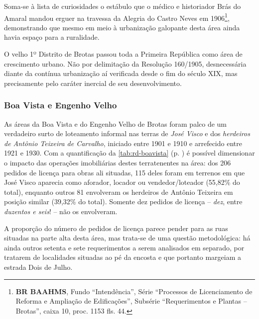 Soma-se à lista de curiosidades o estábulo que o médico e historiador Brás do Amaral mandou erguer na travessa da Alegria do Castro Neves em 1906\footnote{\textbf{BR BAAHMS}, Fundo ``Intendência'', Série ``Processos de Licenciamento de Reforma e Ampliação de Edificações'', Subsérie ``Requerimentos e Plantas -- Brotas'', caixa 10, proc. 1153 fls. 44.}, demonstrando que mesmo em meio à urbanização galopante desta área ainda havia espaço para a ruralidade.


O velho 1º Distrito de Brotas passou toda a Primeira República como área de crescimento urbano. Não por delimitação da Resolução 160/1905, desnecessária diante da contínua urbanização aí verificada desde o fim do século XIX, mas precisamente pelo caráter inercial de seu desenvolvimento. 

\subsubsection{Boa Vista e Engenho Velho}


As áreas da Boa Vista e do Engenho Velho de Brotas foram palco de um verdadeiro surto de loteamento informal nas terras de \textit{José Visco} e dos \textit{herdeiros de Antônio Teixeira de Carvalho}, iniciado entre 1901 e 1910 e arrefecido entre 1921 e 1930. Com a quantificação da \autoref{tab:rd-boavista} (p. \pageref{tab:rd-boavista}) é possível dimensionar o impacto das operações imobiliárias destes terratenentes na área: dos 206 pedidos de licença para obras ali situadas, 115 deles foram em terrenos em que José Visco aparecia como aforador, locador ou vendedor/loteador (55,82\% do total), enquanto outros 81 envolveram os herdeiros de Antônio Teixeira em posição similar (39,32\% do total). Somente dez pedidos de licença – \textit{dez}, entre \textit{duzentos e seis}! – não os envolveram.





A proporção do número de pedidos de licença parece pender para as ruas situadas na parte alta desta área, mas trata-se de uma questão metodológica: há ainda outros setenta e sete requerimentos a serem analisados em separado, por tratarem de localidades situadas ao pé da encosta e que portanto margeiam a estrada Dois de Julho.

